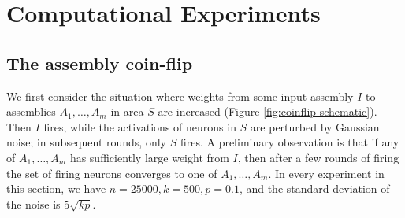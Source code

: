 \documentclass{article}
\theoremstyle{remark}
\newcommand{\1}{\mathbbm{1}}
\DeclareRobustCommand{\mitro}[1]{{\color{red} (Dan: #1)}}
\begin{document}



\section{Computational Experiments}
\subsection{The assembly coin-flip}
We first consider the situation where weights from some input assembly $I$ to assemblies $A_1, \ldots, A_m$ in area $S$ are increased (Figure \ref{fig:coinflip-schematic}). Then $I$ fires, while the activations of neurons in $S$ are perturbed by Gaussian noise; in subsequent rounds, only $S$ fires. A preliminary observation is that if any of $A_1, \ldots, A_m$ has sufficiently large weight from $I$, then after a few rounds of firing the set of firing neurons converges to one of $A_1, \ldots, A_m$. In every experiment in this section, we have $n=25000, k=500, p=0.1$, and the standard deviation of the noise is $5 \sqrt{kp}$.
\end{document}
